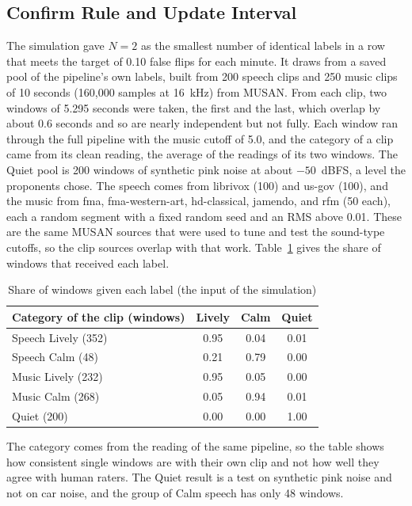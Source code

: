 \subsection{Confirm Rule and Update Interval}
\label{sec:ai-confirm}
The simulation gave $N=2$ as the smallest number of identical labels in a row that meets the target of 0.10 false flips for each minute. It draws from a saved pool of the pipeline's own labels, built from 200 speech clips and 250 music clips of 10 seconds (160,000 samples at 16~kHz) from MUSAN. From each clip, two windows of 5.295 seconds were taken, the first and the last, which overlap by about 0.6 seconds and so are nearly independent but not fully. Each window ran through the full pipeline with the music cutoff of 5.0, and the category of a clip came from its clean reading, the average of the readings of its two windows. The Quiet pool is 200 windows of synthetic pink noise at about $-50$~dBFS, a level the proponents chose. The speech comes from librivox (100) and us-gov (100), and the music from fma, fma-western-art, hd-classical, jamendo, and rfm (50 each), each a random segment with a fixed random seed and an RMS above 0.01. These are the same MUSAN sources that were used to tune and test the sound-type cutoffs, so the clip sources overlap with that work. Table~\ref{tab:ai-pool} gives the share of windows that received each label.

\begin{table}[htbp]
    \centering
    \caption{Share of windows given each label (the input of the simulation)}\label{tab:ai-pool}
    \small
    \renewcommand{\arraystretch}{1.2}
    \begin{tabular}{|l|c|c|c|}
        \hline
        \textbf{Category of the clip (windows)} & \textbf{Lively} & \textbf{Calm} & \textbf{Quiet} \\
        \hline
        Speech Lively (352) & 0.95 & 0.04 & 0.01 \\
        \hline
        Speech Calm (48) & 0.21 & 0.79 & 0.00 \\
        \hline
        Music Lively (232) & 0.95 & 0.05 & 0.00 \\
        \hline
        Music Calm (268) & 0.05 & 0.94 & 0.01 \\
        \hline
        Quiet (200) & 0.00 & 0.00 & 1.00 \\
        \hline
    \end{tabular}
\end{table}

The category comes from the reading of the same pipeline, so the table shows how consistent single windows are with their own clip and not how well they agree with human raters. The Quiet result is a test on synthetic pink noise and not on car noise, and the group of Calm speech has only 48 windows.

